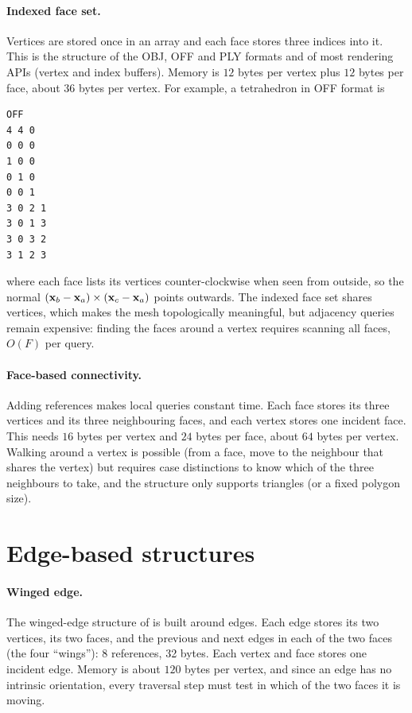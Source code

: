 \paragraph{Indexed face set.} Vertices are stored once in an array and each face stores three
indices into it. This is the structure of the OBJ, OFF and PLY formats and of most rendering APIs
(vertex and index buffers). Memory is $12$ bytes per vertex plus $12$ bytes per face, about $36$
bytes per vertex. For example, a tetrahedron in OFF format is
\begin{lstlisting}[language={},numbers=none]
OFF
4 4 0
0 0 0
1 0 0
0 1 0
0 0 1
3 0 2 1
3 0 1 3
3 0 3 2
3 1 2 3
\end{lstlisting}
where each face lists its vertices counter-clockwise when seen from outside, so the normal
$(\mathbf{x}_b-\mathbf{x}_a)\times(\mathbf{x}_c-\mathbf{x}_a)$ points outwards. The indexed face set shares vertices, which
makes the mesh topologically meaningful, but adjacency queries remain expensive: finding the faces
around a vertex requires scanning all faces, $O(F)$ per query.

\paragraph{Face-based connectivity.} Adding references makes local queries constant time. Each
face stores its three vertices and its three neighbouring faces, and each vertex stores one
incident face. This needs $16$ bytes per vertex and $24$ bytes per face, about $64$ bytes per
vertex. Walking around a vertex is possible (from a face, move to the neighbour that shares the
vertex) but requires case distinctions to know which of the three neighbours to take, and the
structure only supports triangles (or a fixed polygon size).

\section{Edge-based structures}

\paragraph{Winged edge.} The winged-edge structure of \citet{Baumgart1975} is built around
edges. Each edge stores its two vertices, its two faces, and the previous and next edges in each of
the two faces (the four ``wings''): 8 references, 32 bytes. Each vertex and face stores one
incident edge. Memory is about $120$ bytes per vertex, and since an edge has no intrinsic
orientation, every traversal step must test in which of the two faces it is moving.

